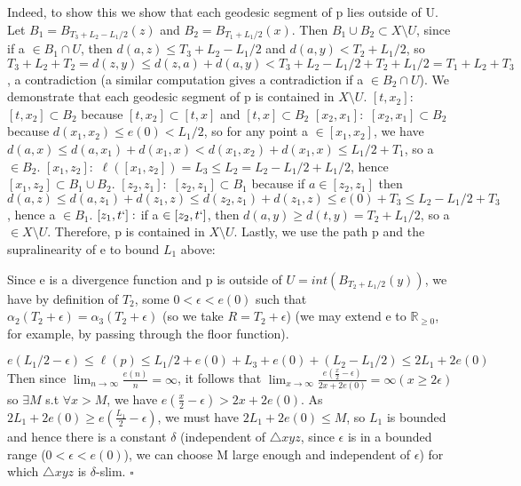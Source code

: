 \documentclass[11pt]{article}
\newcommand{\vs}{\vskip10pt}
\begin{document}
 	 Indeed, to show this we show that each geodesic segment of p lies outside of U. Let $B_1 = B_{
 	 T_3 + L_2 - L_1/2}(z)$ and $B_2 = B_{T_1 + L_1/2}(x)$. Then $B_1 \cup B_2 \subset X \setminus U$, since if a $\in B_1 \cap U$, then $d(a, z) \leq T_3 + L_2 - L_1/2$ and $d(a, y) < T_2 + L_1/2$, so $T_3 + L_2 + T_2 = d(z, y) \leq d(z, a) + d(a,y) < T_3 + L_2 - L_1/2 + T_2 + L_1/2 = T_1 + L_2 + T_3$, a contradiction (a similar computation gives a contradiction if a $\in B_2 \cap U$). We demonstrate that each geodesic segment of p is contained in $X \setminus U$. 
  \vs
  	$[t, x_2]: $ $[t, x_2] \subset B_2$ because $[t, x_2] \subset [t,x]$ and $[t,x] \subset B_2$
  	\vskip5pt
  	$[x_2, x_1]: $ $[x_2, x_1] \subset B_2 $ because $d(x_1, x_2) \leq e(0) < L_1/2$, so for any point a $\in [x_1, x_2]$, we have $d(a, x) \leq d(a, x_1) + d(x_1, x) < d(x_1, x_2) + d(x_1, x) \leq L_1/2 + T_1$, so a $\in B_2$.
  	\vskip5pt
  	 $[x_1, z_2]: $ $\ell ([x_1, z_2]) = L_3 \leq L_2 = L_2 - L_1/2 + L_1/2$, hence $[x_1, z_2] \subset B_1 \cup B_2$. 
  	 \vskip5pt
  	 $[z_2, z_1]: $ $[z_2, z_1] \subset B_1$ because if $a \in [z_2, z_1]$ then $d(a, z) \leq d(a, z_1) + d(z_1, z) \leq d(z_2, z_1) + d(z_1, z) \leq e(0) + T_3 \leq L_2 - L_1/2 + T_3$, hence a $\in B_1$.
  	 \vskip5pt
  	 $[z_1, t`]: $ if a $\in [z_2, t`]$, then $d(a, y) \geq d(t, y) = T_2 + L_1/2$, so a $\in X \setminus U$.
  	 \vskip5pt
  	 Therefore, p is contained in $X \setminus U$. 
  	 \vs
  	 Lastly, we use the path p and the supralinearity of e to bound $L_1$ above: 
  	 \vs
  	 
  	 Since e is a divergence function and p is outside of $U = int(B_{T_2 + L_1/2}(y))$, we have by definition of $T_2$, some $0 < \epsilon < e(0)$ such that $\alpha_2(T_2 + \epsilon) = \alpha_3(T_2 + \epsilon)$ (so we take $R = T_2 + \epsilon$) (we may extend e to $\mathbb{R}_{\geq 0}$, for example, by passing through the floor function). 
  	 
  	 \vs
  	 $e(L_1/2 - \epsilon) \leq \ell(p) \leq L_1/2 + e(0) + L_3 + e(0) + (L_2 - L_1/2) \leq 2L_1 + 2e(0)$
  	 \vs
  	 Then since $\lim_{n \rightarrow \infty}\frac{e(n)}{n} = \infty $, it follows that $\lim_{x \rightarrow \infty}\frac{e(\frac{x}{2} - \epsilon)}{2x + 2e(0)}  = \infty ( x \geq 2\epsilon)$
  	 so $\exists M$ s.t $\forall x>M$, we have $e(\frac{x}{2} - \epsilon) > 2x + 2e(0)$. As $2L_1 + 2e(0) \geq e(\frac{L_1}{2} - \epsilon)$, we must have $2L_1 + 2e(0) \leq M$, so $L_1$ is bounded and hence there is a constant $\delta$ (independent of $\triangle xyz$, since $\epsilon$ is in a bounded range ($0 < \epsilon < e(0)$), we can choose M large enough and independent of $\epsilon$) for which $\triangle xyz$ is $\delta$-slim. 
  	 $\square$
 	 
\end{document}
